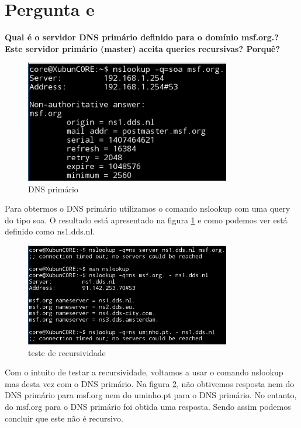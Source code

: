 \documentclass[a4paper]{report}
\begin{document}
\section{Pergunta e}
\textbf{Qual é o servidor DNS primário definido para o domínio msf.org.? Este
servidor primário (master) aceita queries recursivas? Porquê?}

\begin{figure}[H]
    \centering 
    \includegraphics[width=0.8\textwidth]{images/dnsprimario.png}  
    \caption{DNS primário}
    \label{fig:dnsprimario}
\end{figure}
Para obtermos o DNS primário utilizamos o comando nslookup com uma query
do tipo soa. O resultado está apresentado na figura \ref{fig:dnsprimario} e
como podemos ver está definido como ns1.dds.nl.

\begin{figure}[H]
    \centering 
    \includegraphics[width=0.8\textwidth]{images/recursivo.png}  
    \caption{teste de recursividade}
    \label{fig:recursivo}
\end{figure}
Com o intuito de testar a recursividade, voltamos a usar o comando nslookup
mas desta vez com o DNS primário. Na figura \ref{fig:recursivo}, não obtivemos
resposta nem do DNS primário para msf.org nem do uminho.pt para o DNS primário.
No entanto, do msf.org para o DNS primário foi obtida uma resposta. Sendo assim
podemos concluir que este não é recursivo.
\end{document}
